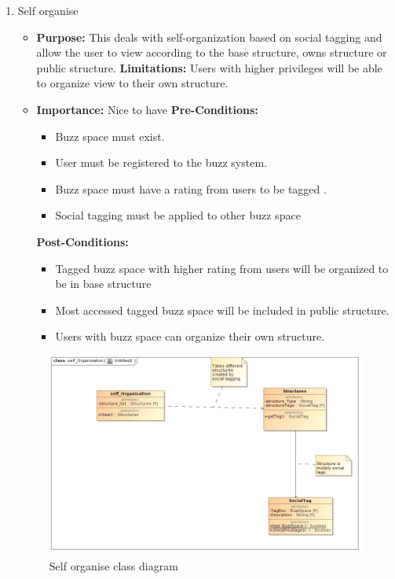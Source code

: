 \documentclass[11pt]{article}
\begin{document}
\begin{enumerate}
\item Self organise
\begin{itemize}
\item \textbf{Purpose:}
This deals with self-organization based on social tagging and
allow the user to view according to the base structure, owns structure
or public structure.
\newline
\textbf{Limitations:} 
Users with higher privileges will be able to
organize view to their own structure.

\item \textbf{Importance:}  Nice to have\newline
\textbf{Pre-Conditions: }
	\begin{itemize}
	\item Buzz space must exist.
	\item User must be registered to the buzz system.
	\item Buzz space must have a rating from users to be tagged .
	\item Social tagging must be applied to other buzz space
	\end{itemize}

\textbf{Post-Conditions: }
	\begin{itemize}
	\item Tagged buzz space with higher rating from users will be organized
to be in base structure
	\item Most accessed tagged buzz space will be included in public structure.
	\item Users with buzz space can organize their own structure.
	\end{itemize}
\end{itemize}

\begin{figure}[H]	
\graphicspath{ {../Diagrams/sfiso/} }
    	\includegraphics[scale=0.5]{selfC.jpg}
    	\caption{Self organise class diagram}
	\end{figure}


\end{enumerate}
\end{document}
